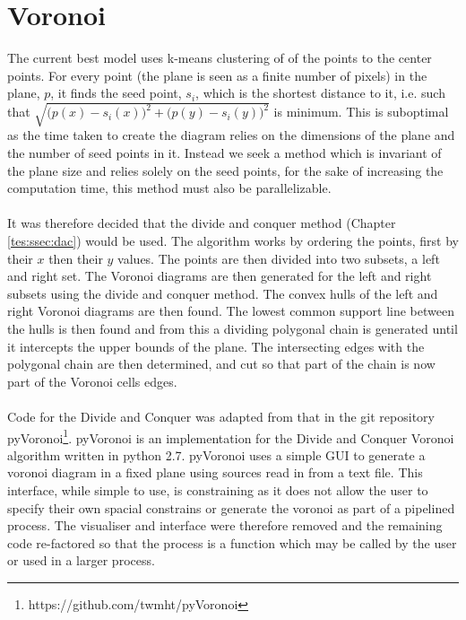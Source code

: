 \section{Voronoi}
The current best model uses k-means clustering of of the points to the center points. For every point (the plane is seen as a finite number of pixels) in the plane, $p$, it finds the seed point, $s_i$, which is the shortest distance to it, i.e. such that $\sqrt{\big(p(x)-s_i(x)\big)^2 + \big(p(y)-s_i(y)\big)^2}$ is minimum. This is suboptimal as the time taken to create the diagram relies on the dimensions of the plane and the number of seed points in it. Instead we seek a method which is invariant of the plane size and relies solely on the seed points, for the sake of increasing the computation time, this method must also be parallelizable. 
\\
\\
It was therefore decided that the divide and conquer method (Chapter \ref{tes:ssec:dac}) would be used. The algorithm works by ordering the points, first by their $x$ then their $y$ values. The points are then divided into two subsets, a left and right set. The Voronoi diagrams are then generated for the left and right subsets using the divide and conquer method. The convex hulls of the left and right Voronoi diagrams are then found. The lowest common support line between the hulls is then found and from this a dividing polygonal chain is generated until it intercepts the upper bounds of the plane. The intersecting edges with the polygonal chain are then determined, and cut so that part of the chain is now part of the Voronoi cells edges.
\\
\\
Code for the Divide and Conquer was adapted from that in the git repository pyVoronoi\footnote{https://github.com/twmht/pyVoronoi}. pyVoronoi is an implementation for the Divide and Conquer Voronoi algorithm written in python 2.7. pyVoronoi uses a simple GUI to generate a voronoi diagram in a fixed plane using sources read in from a text file. This interface, while simple to use, is constraining as it does not allow the user to specify their own spacial constrains or generate the voronoi as part of a pipelined process. The visualiser and interface were therefore removed and the remaining code re-factored so that the process is a function which may be called by the user or used in a larger process.

